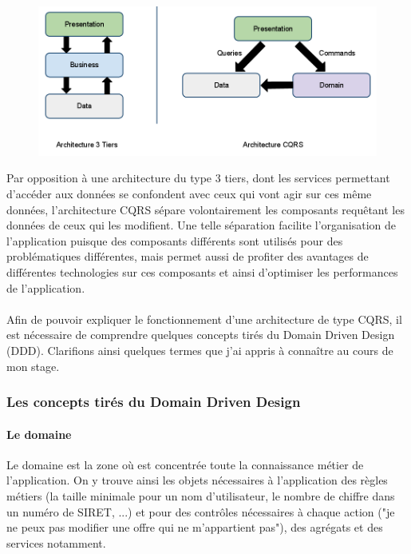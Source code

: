 \paragraph{}
\begin{figure}[h]
  \begin{center}
    \includegraphics[scale=0.4]{Figures/Chapter3/architecture/tiersvscqrs.png}
  \end{center}
\end{figure}
Par opposition à une architecture du type 3 tiers, dont les services permettant d'accéder aux données se confondent avec ceux qui vont agir sur ces même données, l'architecture CQRS sépare volontairement les composants requêtant les données de ceux qui les modifient.
Une telle séparation facilite l'organisation de l'application puisque des composants différents sont utilisés pour des problématiques différentes, mais permet aussi de profiter des avantages de différentes technologies sur ces composants et ainsi d'optimiser les performances de l'application.
\paragraph{}
Afin de pouvoir expliquer le fonctionnement d'une architecture de type CQRS, il est nécessaire de comprendre quelques concepts tirés du Domain Driven Design (DDD).
Clarifions ainsi quelques termes que j'ai appris à connaître au cours de mon stage.

\subsubsection{Les concepts tirés du Domain Driven Design}
\label{subs:Les concepts tirés du Domain Driven Design}
\paragraph{Le domaine}
\label{par:Le domaine}
Le domaine est la zone où est concentrée toute la connaissance métier de l'application.
On y trouve ainsi les objets nécessaires à l'application des règles métiers (la taille minimale pour un nom d'utilisateur, le nombre de chiffre dans un numéro de SIRET, ...) et pour des contrôles nécessaires à chaque action ("je ne peux pas modifier une offre qui ne m'appartient pas"), des agrégats et des services notamment.
